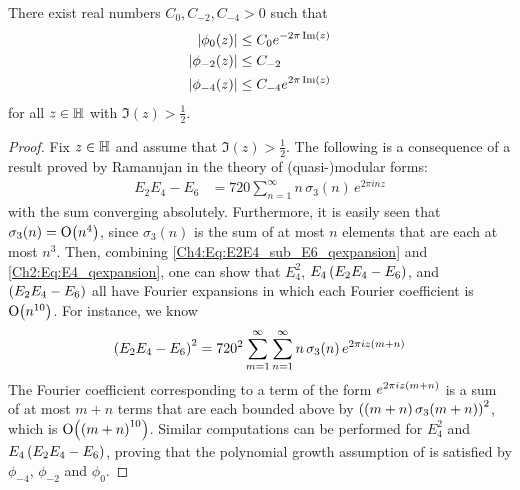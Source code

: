 \begin{boxlemma}\label{Ch4:Lemma:PolyFourierCoeffBound_Apply}
    There exist real numbers $C_0, C_{-2}, C_{-4} > 0$ such that
    \begin{align*}
        \left\lvert \phi_0\!\left( z \right) \right\rvert &\leq C_{0} e^{-2\pi\operatorname{Im}(z)} \\
        \left\lvert \phi_{-2}\!\left( z \right) \right\rvert &\leq C_{-2} \\
        \left\lvert \phi_{-4}\!\left( z \right) \right\rvert &\leq C_{-4} e^{2\pi\operatorname{Im}(z)}
    \end{align*}
    for all $z \in \mathbb{H}$ with $\Im(z) > \frac{1}{2}$.
\end{boxlemma}
\begin{proof}
    Fix $z \in \mathbb{H}$ and assume that $\Im(z) > \frac{1}{2}$. The following is a consequence of a result proved by Ramanujan  in the theory of (quasi-)modular forms:
    \begin{align}
        E_2 E_4 - E_6 &= 720 \sum_{n=1}^{\infty} n \, \sigma_3(n) \, e^{2\pi i nz}
        \label{Ch4:Eq:E2E4_sub_E6_qexpansion}
    \end{align}
    with the sum converging absolutely. Furthermore, it is easily seen that $\sigma_3(n) = \operatorname{O}\!\left( n^4 \right)$, since $\sigma_3(n)$ is the sum of at most $n$ elements that are each at most $n^3$. Then, combining \eqref{Ch4:Eq:E2E4_sub_E6_qexpansion} and \eqref{Ch2:Eq:E4_qexpansion}, one can show that $E_4^2$, $E_4\left( E_2 E_4 - E_6 \right)$, and $\left( E_2 E_4 - E_6 \right)$ all have Fourier expansions in which each Fourier coefficient is $\operatorname{O}\!\left( n^{10} \right)$.  For instance, we know
    \begin{align}
        \left( E_2 E_4 - E_6 \right)^2 = 720^2 \sum_{m=1}^{\infty} \sum_{n=1}^{\infty} n \, \sigma_3(n) \, e^{2\pi i z \left( m + n \right)}
        \label{Ch4:Eq:E2E4_sub_E6_sq_qexpansion}
    \end{align}
    The Fourier coefficient corresponding to a term of the form $e^{2 \pi i z \left( m + n \right)}$ is a sum of at most $m + n$ terms that are each bounded above by $\left( \left( m + n \right)\sigma_3\!\left( m + n \right) \right)^2$, which is $\operatorname{O}\!\left( \left( m + n \right)^{10} \right)$. Similar computations can be performed for $E_4^2$ and $E_4\left( E_2 E_4 - E_6 \right)$, proving that the polynomial growth assumption of  is satisfied by $\phi_{-4}$, $\phi_{-2}$ and $\phi_0$.


\end{proof}

